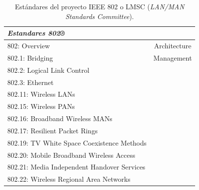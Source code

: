 


\begin{table}[ht]
	\centering
	\caption{Estándares del proyecto IEEE 802 o LMSC (\textit{LAN/MAN Standards Committee}).}
	\begin{tabular}{@{} l *1c @{}}    \toprule
		\emph{\textbf{Estandares 802®}} \\
		\midrule
        802: Overview & Architecture\\
        802.1: Bridging & Management\\
        802.2: Logical Link Control\\
        802.3: Ethernet\\
        802.11: Wireless LANs\\
        802.15: Wireless PANs\\
        802.16: Broadband Wireless MANs\\
        802.17: Resilient Packet Rings\\
        802.19: TV White Space Coexistence Methods\\
        802.20: Mobile Broadband Wireless Access\\
        802.21: Media Independent Handover Services\\
        802.22: Wireless Regional Area Networks\\
		\bottomrule
		\hline
	\end{tabular}
	\label{tab:802}
\end{table}

